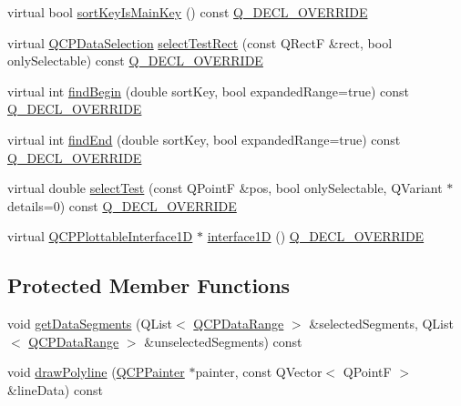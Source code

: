 \begin{DoxyCompactItemize}
\item 
virtual bool \mbox{\hyperlink{class_q_c_p_abstract_plottable1_d_afe0d56e39cc076032922f059b304c092}{sort\+Key\+Is\+Main\+Key}} () const \mbox{\hyperlink{qcustomplot_8h_a42cc5eaeb25b85f8b52d2a4b94c56f55}{Q\+\_\+\+D\+E\+C\+L\+\_\+\+O\+V\+E\+R\+R\+I\+DE}}
\item 
virtual \mbox{\hyperlink{class_q_c_p_data_selection}{Q\+C\+P\+Data\+Selection}} \mbox{\hyperlink{class_q_c_p_abstract_plottable1_d_a22377bf6e57ab7eedbc9e489250c6ded}{select\+Test\+Rect}} (const Q\+RectF \&rect, bool only\+Selectable) const \mbox{\hyperlink{qcustomplot_8h_a42cc5eaeb25b85f8b52d2a4b94c56f55}{Q\+\_\+\+D\+E\+C\+L\+\_\+\+O\+V\+E\+R\+R\+I\+DE}}
\item 
virtual int \mbox{\hyperlink{class_q_c_p_abstract_plottable1_d_ad0b46d25cde3d035b180fb8f10c056e6}{find\+Begin}} (double sort\+Key, bool expanded\+Range=true) const \mbox{\hyperlink{qcustomplot_8h_a42cc5eaeb25b85f8b52d2a4b94c56f55}{Q\+\_\+\+D\+E\+C\+L\+\_\+\+O\+V\+E\+R\+R\+I\+DE}}
\item 
virtual int \mbox{\hyperlink{class_q_c_p_abstract_plottable1_d_a6e3ba20c9160d7361e58070390d10b1a}{find\+End}} (double sort\+Key, bool expanded\+Range=true) const \mbox{\hyperlink{qcustomplot_8h_a42cc5eaeb25b85f8b52d2a4b94c56f55}{Q\+\_\+\+D\+E\+C\+L\+\_\+\+O\+V\+E\+R\+R\+I\+DE}}
\item 
virtual double \mbox{\hyperlink{class_q_c_p_abstract_plottable1_d_a4611b43bcb6441b2154eb4f4e0a33db2}{select\+Test}} (const Q\+PointF \&pos, bool only\+Selectable, Q\+Variant $\ast$details=0) const \mbox{\hyperlink{qcustomplot_8h_a42cc5eaeb25b85f8b52d2a4b94c56f55}{Q\+\_\+\+D\+E\+C\+L\+\_\+\+O\+V\+E\+R\+R\+I\+DE}}
\item 
virtual \mbox{\hyperlink{class_q_c_p_plottable_interface1_d}{Q\+C\+P\+Plottable\+Interface1D}} $\ast$ \mbox{\hyperlink{class_q_c_p_abstract_plottable1_d_ac58fb47bfe330f6931ed8e64326387d7}{interface1D}} () \mbox{\hyperlink{qcustomplot_8h_a42cc5eaeb25b85f8b52d2a4b94c56f55}{Q\+\_\+\+D\+E\+C\+L\+\_\+\+O\+V\+E\+R\+R\+I\+DE}}
\end{DoxyCompactItemize}
\subsection*{Protected Member Functions}
\begin{DoxyCompactItemize}
\item 
void \mbox{\hyperlink{class_q_c_p_abstract_plottable1_d_ae890e62ce403c54f575c73b9529f1af8}{get\+Data\+Segments}} (Q\+List$<$ \mbox{\hyperlink{class_q_c_p_data_range}{Q\+C\+P\+Data\+Range}} $>$ \&selected\+Segments, Q\+List$<$ \mbox{\hyperlink{class_q_c_p_data_range}{Q\+C\+P\+Data\+Range}} $>$ \&unselected\+Segments) const
\item 
void \mbox{\hyperlink{class_q_c_p_abstract_plottable1_d_a7adc6c3cccebb5341f11e0c2b7d54206}{draw\+Polyline}} (\mbox{\hyperlink{class_q_c_p_painter}{Q\+C\+P\+Painter}} $\ast$painter, const Q\+Vector$<$ Q\+PointF $>$ \&line\+Data) const
\end{DoxyCompactItemize}
